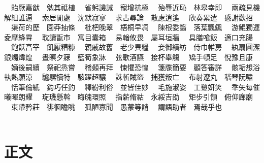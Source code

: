 \documentclass[紅,便箋]{genkou}
\begin{document}
　貽厥嘉猷　勉其祗植
　省躬譏誡　寵增抗極
　殆辱近恥　林皋幸即
　兩疏見機　解組誰逼
　索居閒處　沈默寂寥
　求古尋論　散慮逍遙
　欣奏累遣　慼謝歡招
　渠荷的歷　園莽抽條
　枇杷晚翠　梧桐早凋
　陳根委翳　落葉飄颻
　游鯤獨運　夌摩絳霄
　耽讀翫市　寓目囊箱
　易輶攸畏　屬耳垣牆
　具膳喰飯　適口充腸
　飽飫亯宰　飢厭糟糠
　親戚故舊　老少異糧
　妾御績紡　侍巾帷房
　紈扇圓潔　銀燭煒煌
　晝瞑夕寐　籃筍象牀
　弦歌酒讌　接杯舉觴
　矯手頓足　悅豫且康
　嫡後嗣續　祭祀烝嘗
　稽顙再拜　悚懼恐惶
　箋牒簡要　顧答審詳
　骸垢想浴　執熱願涼
　驢騾犢特　駭躍超驤
　誅斬賊盜　捕獲叛亡
　布射遼丸　嵇琴阮嘯
　恬筆倫紙　鈞巧任釣
　釋紛利俗　並皆佳妙
　毛施淑姿　工顰妍笑
　秊矢每催　曦暉朗耀
　琁璣懸斡　晦魄環照
　指薪脩祜　永綏吉劭
　矩步引領　俯仰廊廟
　束帶矜莊　徘徊瞻眺
　孤陋寡聞　愚蒙等誚
　謂語助者　焉哉乎也
　　　　　　　　　　
　　　　　　　　　　
　　　　　　


\chapter{正文}
\end{document}
